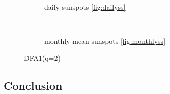 \begin{figure}[htb]
	\centering
	\begin{subfigure}{\textwidth}
		
		\caption{}
	\end{subfigure}

	\begin{subfigure}{0.48\textwidth}
		
		\caption{daily sunspots \ref{fig:dailyss}}
	\end{subfigure}
	~
	\begin{subfigure}{0.48\textwidth}
		
		\caption{monthly mean sunspots \ref{fig:monthlyss}}
	\end{subfigure}
	\caption{DFA1(q=2)}
\end{figure}

\subsection{Conclusion}